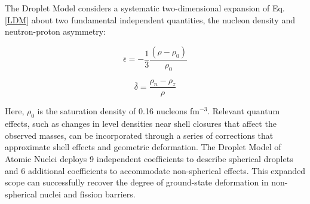 The Droplet Model \cite{MyersAndSwiatecki} considers a systematic two-dimensional expansion of
Eq. \ref{LDM} about two fundamental independent quantities, the nucleon density
and neutron-proton asymmetry:

\begin{equation} \label{DropletIndependentQuantities}
    \bar{\epsilon} = -\frac{1}{3}\frac{(\rho - \rho_{0})}{\rho_{0}}
\end{equation}

\begin{equation}
    \bar{\delta} = \frac{\rho_{n}-\rho_{z}}{\rho}
\end{equation}

\noindent
Here, $\rho_{0}$ is the saturation density of 0.16 nucleons fm$^{-3}$. Relevant quantum
effects, such as changes in level densities near shell closures
that affect the observed masses, can be incorporated through a series of corrections
that approximate shell effects and geometric deformation.
The Droplet Model of Atomic Nuclei deploys 9 
independent coefficients to describe spherical droplets and 6 additional
coefficients to accommodate non-spherical effects. This expanded scope
can successfully recover the degree of ground-state deformation in non-spherical
nuclei and fission barriers.

